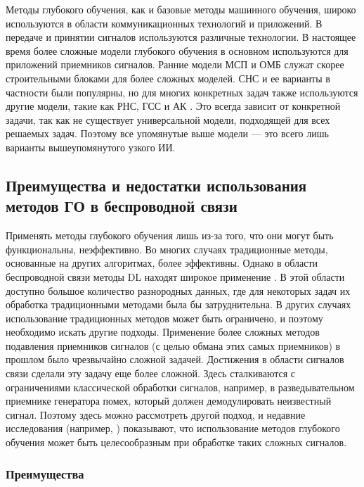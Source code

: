 
\FloatBarrier

Методы глубокого обучения, как и базовые методы машинного обучения, широко используются в области коммуникационных технологий и приложений. В передаче и принятии сигналов используются различные технологии. В настоящее время более сложные модели глубокого обучения в основном используются для приложений приемников сигналов. Ранние модели МСП и ОМБ служат скорее строительными блоками для более сложных моделей. СНС и ее варианты \cite{quavdeeplearn} в частности были популярны, но для многих конкретных задач также используются другие модели, такие как РНС, ГСС и АК \cite{mitigatingdeeplearn}. Это всегда зависит от конкретной задачи, так как не существует универсальной модели, подходящей для всех решаемых задач. Поэтому все упомянутые выше модели — это всего лишь варианты вышеупомянутого узкого ИИ.

\subsection{Преимущества и недостатки использования методов ГО в беспроводной связи}

Применять методы глубокого обучения лишь из-за того, что они могут быть функциональны, неэффективно. Во многих случаях традиционные методы, основанные на других алгоритмах, более эффективны. Однако в области беспроводной связи методы DL находят широкое применение \cite{radiosproof}. В этой области доступно большое количество разнородных данных, где для некоторых задач их обработка традиционными методами была бы затруднительна. В других случаях использование традиционных методов может быть ограничено, и поэтому необходимо искать другие подходы. Применение более сложных методов подавления приемников сигналов (с целью обмана этих самых приемников) в прошлом было чрезвычайно сложной задачей. Достижения в области сигналов связи сделали эту задачу еще более сложной. Здесь сталкиваются с ограничениями классической обработки сигналов, например, в разведывательном приемнике генератора помех, который должен демодулировать неизвестный сигнал. Поэтому здесь можно рассмотреть другой подход, и недавние исследования (например, \cite{recieverbasedondl}) показывают, что использование методов глубокого обучения может быть целесообразным при обработке таких сложных сигналов.

\subsubsection{Преимущества}

